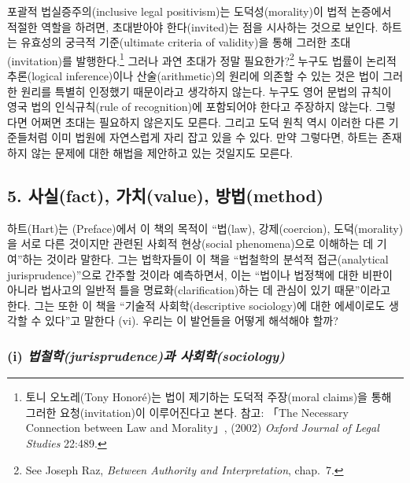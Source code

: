 \documentclass[12pt, oneside]{book}  %
\begin{document}
포괄적 법실증주의(inclusive legal positivism)는 도덕성(morality)이 법적
논증에서 적절한 역할을 하려면, 초대받아야 한다(invited)는 점을 시사하는
것으로 보인다. 하트는 유효성의 궁극적 기준(ultimate criteria of
validity)을 통해 그러한 초대(invitation)를 발행한다.\footnote{토니
  오노레(Tony Honoré)는 법이 제기하는 도덕적 주장(moral claims)을 통해
  그러한 요청(invitation)이 이루어진다고 본다. 참고: 「The Necessary
  Connection between Law and Morality」, (2002) \emph{Oxford Journal of
  Legal Studies} 22:489.} 그러나 과연 초대가 정말 필요한가?\footnote{See
  Joseph Raz, \emph{Between Authority and Interpretation}, chap.~7.}
누구도 법률이 논리적 추론(logical inference)이나 산술(arithmetic)의
원리에 의존할 수 있는 것은 법이 그러한 원리를 특별히 인정했기 때문이라고
생각하지 않는다. 누구도 영어 문법의 규칙이 영국 법의 인식규칙(rule of
recognition)에 포함되어야 한다고 주장하지 않는다. 그렇다면 어쩌면 초대는
필요하지 않은지도 모른다. 그리고 도덕 원칙 역시 이러한 다른 기준들처럼
이미 법원에 자연스럽게 자리 잡고 있을 수 있다. 만약 그렇다면, 하트는
존재하지 않는 문제에 대한 해법을 제안하고 있는 것일지도 모른다.

\subsection{\texorpdfstring{\textbf{5. 사실(fact), 가치(value),
방법(method)}}{5. 사실(fact), 가치(value), 방법(method)}}\label{uxc0acuxc2e4fact-uxac00uxce58value-uxbc29uxbc95method}

하트(Hart)는 (Preface)에서 이 책의 목적이 ``법(law), 강제(coercion),
도덕(morality)을 서로 다른 것이지만 관련된 사회적 현상(social
phenomena)으로 이해하는 데 기여''하는 것이라 말한다. 그는 법학자들이 이
책을 ``법철학의 분석적 접근(analytical jurisprudence)''으로 간주할
것이라 예측하면서, 이는 ``법이나 법정책에 대한 비판이 아니라 법사고의
일반적 틀을 명료화(clarification)하는 데 관심이 있기 때문''이라고 한다.
그는 또한 이 책을 ``기술적 사회학(descriptive sociology)에 대한
에세이로도 생각할 수 있다''고 말한다 (vi). 우리는 이 발언들을 어떻게
해석해야 할까?

\subsubsection{\texorpdfstring{(i) \emph{법철학(jurisprudence)과
사회학(sociology)}}{(i) 법철학(jurisprudence)과 사회학(sociology)}}\label{i-uxbc95uxcca0uxd559jurisprudenceuxacfc-uxc0acuxd68cuxd559sociology}
\end{document}

